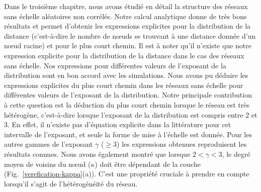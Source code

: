 Dans le troisième chapitre, nous avons étudié en détail la structure  des réseaux sans échelle aléatoires non corrélés. Notre calcul analytique donne de très bons résultats et permet d'obtenir les expressions explicites pour la distribution de la distance (c'est-à-dire le nombre de nœuds se trouvant à une distance donnée d'un nœud racine) et pour le plus court chemin. Il est à noter qu'il n’existe que notre expression explicite pour la distribution de la distance dans le cas des réseaux sans échelle. Nos expressions pour différentes valeurs de l'exposant de la distribution sont en bon accord avec les simulations. Nous avons pu déduire les expressions explicites du plus court chemin dans les réseaux sans échelle pour différentes valeurs de l'exposant de la distribution. Notre principale contribution à cette question est la déduction du plus court chemin lorsque le réseau est très hétérogène, c'est-à-dire  lorsque l'exposant de la distribution est compris entre $2$ et $3$. En effet, il n’existe pas d’équation explicite dans la littérature pour cet intervalle de l'exposant, et seule la forme de mise à l'échelle est donnée. Pour les autres gammes de l'exposant $\gamma$ ($\geq 3$) les expressions obtenues reproduisent les résultats connues. 
Nous avons également montré que lorsque $2 <\gamma <3$, le degré moyen de voisins du nœud ($\kappa$) doit être dépendant de la couche (Fig.~\ref{verefication-kappa}(a)). C’est une propriété cruciale à prendre en compte lorsqu’il s’agit de l’hétérogénéité du réseau.


